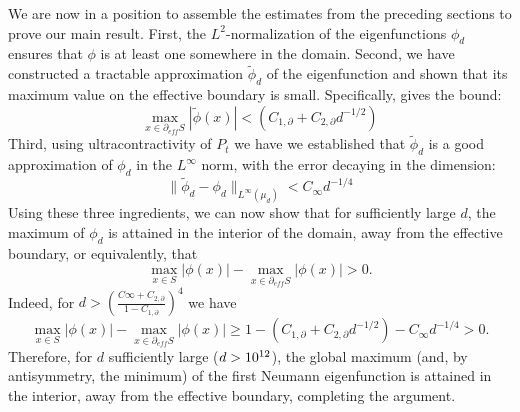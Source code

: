 We are now in a position to assemble the estimates from the preceding sections to prove our main result. First, the $L^2$-normalization of the eigenfunctions $\phi_d$ ensures that $\phi$ is at least one somewhere in the domain. Second, we have constructed a tractable approximation $\tilde\phi_d$ of the eigenfunction and shown that its maximum value on the effective boundary is small. Specifically,  gives the bound:
$$
\max_{x \in \partial_{eff} S} |\tilde{\phi}(x)| < (C_{1,\partial} + C_{2,\partial}d^{-1/2})
$$
Third, using ultracontractivity of $P_t$ we have we established that $\tilde\phi_d$ is a good approximation of $\phi_d$ in the $L^\infty$ norm, with the error decaying in the dimension:
$$
\|\tilde\phi_d - \phi_d\|_{L^\infty(\mu_d)} < C_\infty d^{-1/4}
$$
Using these three ingredients, we can now show that for sufficiently large $d$, the maximum of $\phi_d$ is attained in the interior of the domain, away from the effective boundary, or equivalently, that
$$
\max_{x \in S} |\phi(x)| - \max_{x \in \partial_{eff} S}  |\phi(x)| > 0.
$$
Indeed, for $d > \left(\frac{C\infty+ C_{2,\partial}}{1 - C_{1,\partial}}\right)^4$ we have
$$
\max_{x \in S} |\phi(x)| - \max_{x \in \partial_{eff} S}  |\phi(x)| 
\ge 1 - (C_{1,\partial} + C_{2,\partial}d^{-1/2}) - C_\infty d^{-1/4} > 0.
$$
Therefore, for $d$ sufficiently large ($d > 10^{12}$), the global maximum (and, by antisymmetry, the minimum) of the first Neumann eigenfunction is attained in the interior, away from the effective boundary, completing the argument.


\newpage
